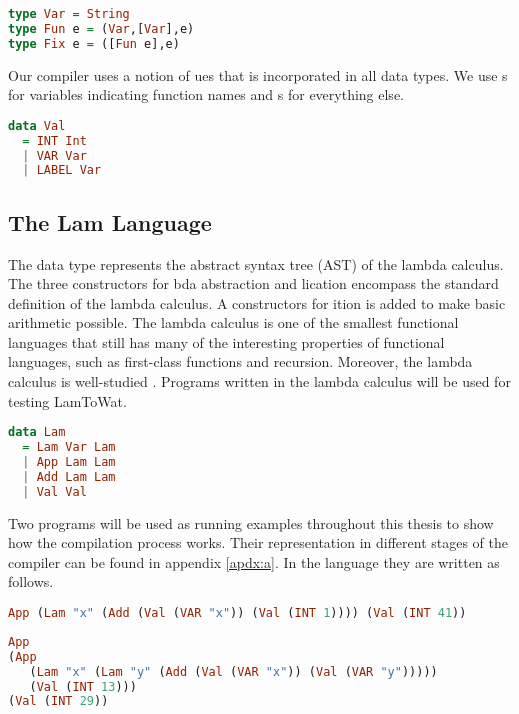\begin{lstlisting}[language=Haskell]
type Var = String
type Fun e = (Var,[Var],e)
type Fix e = ([Fun e],e)
\end{lstlisting}

Our compiler uses a notion of ues that is incorporated in all data types. We use s for variables indicating function names and s for everything else.

\begin{lstlisting}[language=Haskell]
data Val
  = INT Int
  | VAR Var
  | LABEL Var
\end{lstlisting}

\subsection{\label{subsection:expdata}The Lam Language}
The  data type represents the abstract syntax tree (AST) of the lambda calculus. The three constructors for bda abstraction and lication encompass the standard definition of the lambda calculus. A constructors for ition is added to make basic arithmetic possible. The lambda calculus is one of the smallest functional languages that still has many of the interesting properties of functional languages, such as first-class functions and recursion. Moreover, the lambda calculus is well-studied \autocite{barendregt1984lambda}. Programs written in the lambda calculus will be used for testing LamToWat.

\begin{lstlisting}[language=Haskell]
data Lam
  = Lam Var Lam
  | App Lam Lam
  | Add Lam Lam
  | Val Val
\end{lstlisting}

Two programs will be used as running examples throughout this thesis to show how the compilation process works. Their representation in different stages of the compiler can be found in appendix \ref{apdx:a}. In the  language they are written as follows.

\begin{lstlisting}[language=Haskell]
App (Lam "x" (Add (Val (VAR "x")) (Val (INT 1)))) (Val (INT 41))
\end{lstlisting}

\begin{lstlisting}[language=Haskell]
App
(App
   (Lam "x" (Lam "y" (Add (Val (VAR "x")) (Val (VAR "y")))))
   (Val (INT 13)))
(Val (INT 29))
\end{lstlisting}


